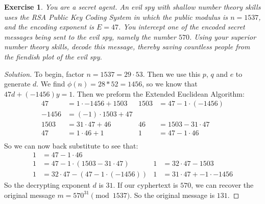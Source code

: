 \documentclass[12pt,leqno]{article}
\numberwithin{equation}{section}
\newtheorem{exer}[thm]{Exercise}
\theoremstyle{definition}
\begin{document}
\pagebreak
\begin{exer}
  You are a secret agent. An evil spy with shallow number theory
  skills uses the RSA Public Key Coding System in which the public
  modulus is $n=1537$, and the encoding exponent is $E=47$. You
  intercept one of the encoded secret messages being sent to the evil
  spy, namely the number $570$. Using your superior number theory
  skills, decode this message, thereby saving countless people from
  the fiendish plot of the evil spy.
\end{exer}
\begin{proof}[Solution]
  To begin, factor $n = 1537 = 29\cdot 53$.  Then we use this $p$, $q$ and $e$ to generate $d$.  We find $\phi(n) = 28 * 52 = 1456$, so we know that $47d + (-1456)y = 1$.  Then we preform the Extended Euclidean Algorithm:
  \begin{align*}
    47 &= 1\cdot -1456 + 1503 & 1503 &= 47 - 1 \cdot (-1456)\\
    -1456 &= (-1)\cdot 1503 + 47\\
    1503 &= 31 \cdot 47 + 46 & 46 &= 1503 - 31 \cdot 47\\
    47 &= 1 \cdot 46 + 1 & 1 &= 47 - 1 \cdot 46\\
  \end{align*}
  So we can now back substitute to see that:
  \begin{align*}
    1 &= 47 - 1\cdot 46\\
    1 &= 47 - 1\cdot (1503 - 31 \cdot 47) & 1 &= 32 \cdot 47 - 1503\\
    1 &= 32\cdot 47 - (47 - 1 \cdot (-1456)) & 1 &= 31\cdot 47 + -1\cdot -1456
  \end{align*}
  So the decrypting exponent $d$ is $31$.  If our cyphertext is $570$, we can recover the original message $m = 570^{31} \pmod{1537}$.  So the original message is $131$.
\end{proof}
\end{document}

